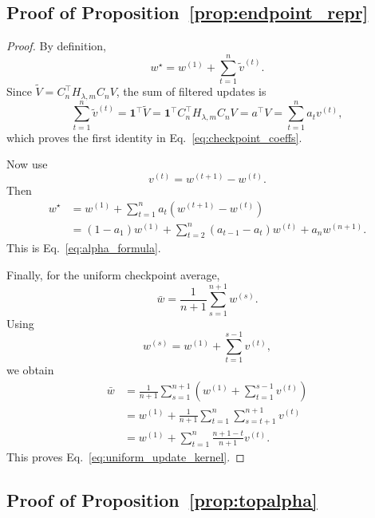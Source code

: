 \documentclass{article}
\newcommand{\paren}[1]{\left( #1 \right)}
\begin{document}
\subsection{Proof of Proposition~\ref{prop:endpoint_repr}}

\begin{proof}
By definition,
\[
w^\star = w^{(1)} + \sum_{t=1}^{n} \widetilde v^{(t)}.
\]
Since \(\widetilde V = C_n^\top H_{\lambda,m} C_n V\), the sum of filtered updates is
\[
\sum_{t=1}^{n} \widetilde v^{(t)}
=
\mathbf{1}^\top \widetilde V
=
\mathbf{1}^\top C_n^\top H_{\lambda,m} C_n V
=
a^\top V
=
\sum_{t=1}^{n} a_t v^{(t)},
\]
which proves the first identity in Eq.~\eqref{eq:checkpoint_coeffs}.

Now use
\[
v^{(t)} = w^{(t+1)} - w^{(t)}.
\]
Then
\begin{align*}
w^\star
&=
w^{(1)} + \sum_{t=1}^{n} a_t \paren{w^{(t+1)} - w^{(t)}} \\
&=
\paren{1-a_1} w^{(1)}
+
\sum_{t=2}^{n} \paren{a_{t-1}-a_t} w^{(t)}
+
a_n w^{(n+1)}.
\end{align*}
This is Eq.~\eqref{eq:alpha_formula}.

Finally, for the uniform checkpoint average,
\[
\bar w = \frac{1}{n+1}\sum_{s=1}^{n+1} w^{(s)}.
\]
Using
\[
w^{(s)} = w^{(1)} + \sum_{t=1}^{s-1} v^{(t)},
\]
we obtain
\begin{align*}
\bar w
&=
\frac{1}{n+1}\sum_{s=1}^{n+1}
\paren{
w^{(1)} + \sum_{t=1}^{s-1} v^{(t)}
} \\
&=
w^{(1)}
+
\frac{1}{n+1}
\sum_{t=1}^{n}
\sum_{s=t+1}^{n+1} v^{(t)} \\
&=
w^{(1)}
+
\sum_{t=1}^{n}
\frac{n+1-t}{n+1}
v^{(t)}.
\end{align*}
This proves Eq.~\eqref{eq:uniform_update_kernel}.
\end{proof}

\subsection{Proof of Proposition~\ref{prop:topalpha}}
\end{document}
